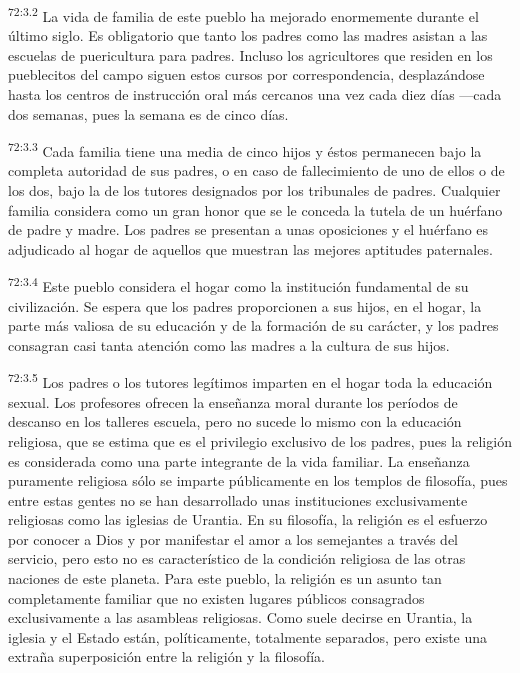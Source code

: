 \par
\textsuperscript{72:3.2} La vida de familia de este pueblo ha mejorado enormemente durante el último siglo. Es obligatorio que tanto los padres como las madres asistan a las escuelas de puericultura para padres. Incluso los agricultores que residen en los pueblecitos del campo siguen estos cursos por correspondencia, desplazándose hasta los centros de instrucción oral más cercanos una vez cada diez días ---cada dos semanas, pues la semana es de cinco días.

\par
\textsuperscript{72:3.3} Cada familia tiene una media de cinco hijos y éstos permanecen bajo la completa autoridad de sus padres, o en caso de fallecimiento de uno de ellos o de los dos, bajo la de los tutores designados por los tribunales de padres. Cualquier familia considera como un gran honor que se le conceda la tutela de un huérfano de padre y madre. Los padres se presentan a unas oposiciones y el huérfano es adjudicado al hogar de aquellos que muestran las mejores aptitudes paternales.

\par
\textsuperscript{72:3.4} Este pueblo considera el hogar como la institución fundamental de su civilización. Se espera que los padres proporcionen a sus hijos, en el hogar, la parte más valiosa de su educación y de la formación de su carácter, y los padres consagran casi tanta atención como las madres a la cultura de sus hijos.

\par
\textsuperscript{72:3.5} Los padres o los tutores legítimos imparten en el hogar toda la educación sexual. Los profesores ofrecen la enseñanza moral durante los períodos de descanso en los talleres escuela, pero no sucede lo mismo con la educación religiosa, que se estima que es el privilegio exclusivo de los padres, pues la religión es considerada como una parte integrante de la vida familiar. La enseñanza puramente religiosa sólo se imparte públicamente en los templos de filosofía, pues entre estas gentes no se han desarrollado unas instituciones exclusivamente religiosas como las iglesias de Urantia. En su filosofía, la religión es el esfuerzo por conocer a Dios y por manifestar el amor a los semejantes a través del servicio, pero esto no es característico de la condición religiosa de las otras naciones de este planeta. Para este pueblo, la religión es un asunto tan completamente familiar que no existen lugares públicos consagrados exclusivamente a las asambleas religiosas. Como suele decirse en Urantia, la iglesia y el Estado están, políticamente, totalmente separados, pero existe una extraña superposición entre la religión y la filosofía.

